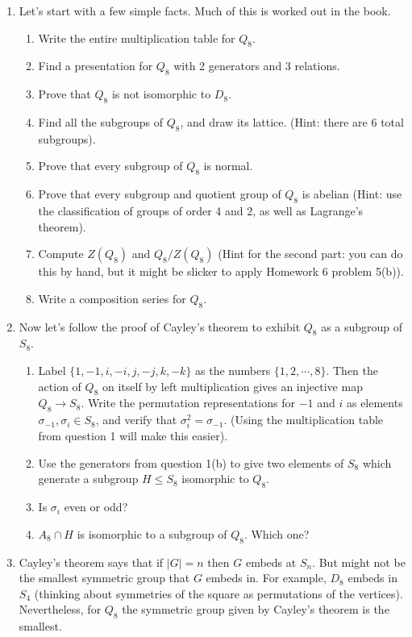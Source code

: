 \documentclass[11pt]{article}
\begin{document}
\begin{enumerate}
  \item Let's start with a few simple facts.  Much of this is worked out in the book.
  \begin{enumerate}
    \item Write the entire multiplication table for $Q_8$.
    \item Find a presentation for $Q_8$ with 2 generators and 3 relations.
    \item Prove that $Q_8$ is not isomorphic to $D_8$.
    \item Find all the subgroups of $Q_8$, and draw its lattice.  (Hint: there are 6 total subgroups).
    \item Prove that every subgroup of $Q_8$ is normal.
    \item Prove that every subgroup and quotient group of $Q_8$ is abelian (Hint: use the classification of groups of order 4 and 2, as well as Lagrange's theorem).
    \item Compute $Z(Q_8)$ and $Q_8/Z(Q_8)$ (Hint for the second part: you can do this by hand, but it might be slicker to apply Homework 6 problem 5(b)).
    \item Write a composition series for $Q_8$.
  \end{enumerate}
  \item Now let's follow the proof of Cayley's theorem to exhibit $Q_8$ as a subgroup of $S_8$.
  \begin{enumerate}
    \item Label $\{1,-1,i,-i,j,-j,k,-k\}$ as the numbers $\{1,2,\cdots,8\}$. Then the action of $Q_8$ on itself by left multiplication gives an injective map $Q_8\to S_8$.  Write the permutation representations for $-1$ and $i$ as elements $\sigma_{-1},\sigma_i\in S_8$, and verify that $\sigma_i^2 = \sigma_{-1}$.  (Using the multiplication table from question 1 will make this easier).
    \item Use the generators from question 1(b) to give two elements of $S_8$ which generate a subgroup $H\le S_8$ isomorphic to $Q_8$.
    \item Is $\sigma_i$ even or odd?
    \item $A_8\cap H$ is isomorphic to a subgroup of $Q_8$.  Which one?
  \end{enumerate}
  \item Cayley's theorem says that if $|G|=n$ then $G$ embeds at $S_n$.  But might not be the smallest symmetric group that $G$ embeds in.  For example, $D_8$ embeds in $S_4$ (thinking about symmetries of the square as permutations of the vertices).  Nevertheless, for $Q_8$ the symmetric group given by Cayley's theorem is the smallest.

\end{enumerate}
\end{document}
